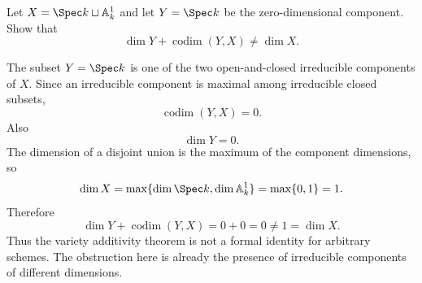 \begin{problem}\label{prob:vi31-02}
Let \(X=\Spec k\sqcup\mathbb A^1_k\) and let \(Y=\Spec k\) be the zero-dimensional component. Show that
\[
\dim Y+\operatorname{codim}(Y,X)\neq\dim X.
\]

\end{problem}

\ifdefined\FullProblemDossiers
\begin{solution}
The subset \(Y=\Spec k\) is one of the two open-and-closed irreducible components of \(X\). Since an
irreducible component is maximal among irreducible closed subsets,
\[
\operatorname{codim}(Y,X)=0.
\]
Also
\[
\dim Y=0.
\]
The dimension of a disjoint union is the maximum of the component dimensions, so
\[
\dim X
=
\max\{\dim\Spec k,\dim\mathbb A^1_k\}
=
\max\{0,1\}
=
1.
\]
Therefore
\[
\dim Y+\operatorname{codim}(Y,X)=0+0=0\ne1=\dim X.
\]
Thus the variety additivity theorem is not a formal identity for arbitrary schemes. The obstruction here is
already the presence of irreducible components of different dimensions.
\end{solution}
\fi
